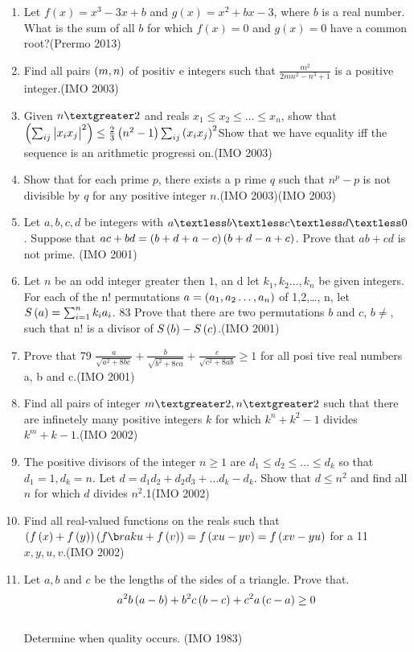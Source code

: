 \begin{enumerate}
\item Let $ f(x) = x^3 - 3x + b $ and $ g(x) = x^2 + bx - 3 $, where $ b $ is a real number. What is the sum of all $ b $ for which $ f(x) = 0 $ and $ g(x) = 0 $ have a common root?\hfill(Prermo 2013)
\item Find all pairs $\left(m,n\right)$ of positiv e integers such that $\frac{m^{2}}{2mn^{2}-n^{3}+1}$ is a positive integer.\hfill(IMO 2003)
 \item Given $n \textgreater 2$ and reals $x_{1} \leq x_{2} \leq \ldots\leq x_{n}$, show that $\left(\sum _{ij} \begin{vmatrix}x_ix_j\end{vmatrix}^2\right) \leq \frac{2}{3}\left(n^ 2-1\right)\sum_{ij} \left(x_ix_j\right)^2$Show that we have equality iff the sequence is an arithmetic progressi on.\hfill(IMO 2003)
 \item Show that for each prime $p$, there exists a p rime $q$ such that $n^{p}-p$ is not divisible by $q$ for any positive integer $n$.\hfill(IMO 2003)(IMO 2003)
 \item Let $a, b, c,d$ be integers with $a\textless b\textless c\textless d\textless 0$. Suppose that $ac+bd=\left(b+d+a-c\right)\left(b+d-a+c\right)$. Prove that $ab+cd$ is not prime. \hfill(IMO 2001)
\item Let $n$ be an odd integer greater then $1$, an d let $k_{1}, k_{2}\ldots,k_{n}$ be given integers. For each of the n! permutations  $a=\left(a_{1}, a _{2}\ldots,a_{n}\right)$ of 1,2,\ldots, n, let $S\left(a\right)=\sum_{i=1}^{n}k_{i}a_{i}$. 83 Prove that there are two permutations $b$ and $c$, $b\neq$, such that n! is a divisor of $S\left(b\right)-S\left(c\right)$.\hfill(IMO 2001)
\item Prove that 79 $\frac{a}{\sqrt{a^{2}+8bc}}+\frac{b}{\sqrt{b^{2}+8c a}}+\frac{c}{\sqrt{c^{2}+8ab}}\geq{1}$ for all posi tive real numbers a, b and c.\hfill(IMO 2001)
\item Find all pairs of integer $m \textgreater 2, n \textgreater 2$ such that there are infinetely many positive integers $k$ for which $k^{n}+k^{ 2}-1$ divides $k^{m}+k-1$.\hfill(IMO 2002)

\item The positive divisors of the integer $ n\geq 1$ are $d_{1}\leq d_{2}\leq \ldots \leq d_{k}$ so that $d_{1}=1, d_{k}=n$. Let $d=d_{1}d_{2}+d_{2 }d_{3}+\ldots d_{k}-d_{k}$. Show that $d\leq n^{2}$ and find all $n$ for which $d$ divides $n^{2}$.\hfil 1(IMO 2002)
\item Find all real-valued functions on the reals such that $\brak{f\brak{x}+f\brak{y}}\brak{f\b rak{u}+f\brak{v}}=f\brak{xu-yv}=f\brak{xv-yu}$ for a 11 $x,y,u,v$.\hfill(IMO 2002)
\item Let $a,b$ and $c$ be the lengths of the sides of a triangle. Prove that.
	\begin{align*} a^2b \left(a-b\right)+b^2c\left(b-c\right)+c^2a\left(c-a\right)\geq 0 \end{align*}\\
		Determine when quality occurs. \hfill(IMO 1983)


\end{enumerate}

